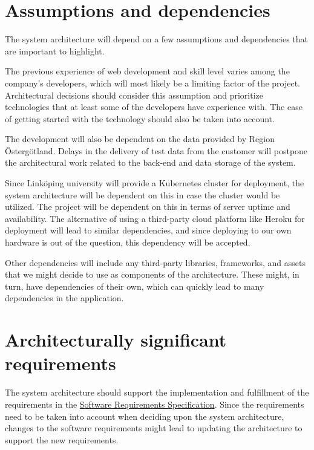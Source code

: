 \documentclass[10pt,a4paper]{article}
\begin{document}
\section{Assumptions and dependencies}
The system architecture will depend on a few assumptions and dependencies that are important to highlight.

The previous experience of web development and skill level varies among the company's developers, which will most likely be a limiting factor of the project. Architectural decisions should  consider this assumption and prioritize technologies that at least some of the developers have experience with. The ease of getting started with the technology should also be taken into account.

The development will also be dependent on the data provided by Region Östergötland. Delays in the delivery of test data from the customer will postpone the architectural work related to the back-end and data storage of the system.

Since Linköping university will provide a Kubernetes cluster for deployment, the system architecture will be dependent on this in case the cluster would be utilized. The project will be dependent on this in terms of server uptime and availability. The alternative of using a third-party cloud platform like Heroku for deployment will lead to similar dependencies, and since deploying to our own hardware is out of the question, this dependency will be accepted.

Other dependencies will include any third-party libraries, frameworks, and assets that we might decide to use as components of the architecture. These might, in turn, have dependencies of their own, which can quickly lead to many dependencies in the application. 

\section{Architecturally significant requirements}

The system architecture should support the implementation and fulfillment of the requirements in the  \href{https://gitlab.liu.se/tddc88-company-1-2021/deploy/-/blob/main/documents/Customer%20Requirements%20Specification/TDDC88_Project___Company_1___Customer_Requirements_Specification%20v%201.8.pdf}{Software Requirements Specification}. Since the requirements need to be taken into account when deciding upon the system architecture, changes to the software requirements might lead to updating the architecture to support the new requirements.
\end{document}
